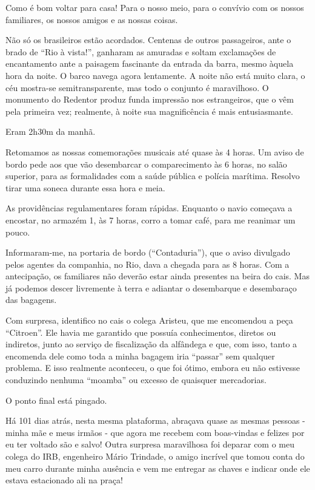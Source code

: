 Como é bom voltar para casa! Para o nosso meio, para o convívio com os nossos familiares, os nossos amigos e as nossas coisas.

Não só os brasileiros estão acordados. Centenas de outros passageiros, ante o brado de “Rio à vista!”, ganharam as amuradas e soltam exclamações de encantamento ante a paisagem fascinante da entrada da barra, mesmo àquela hora da noite. O barco navega agora lentamente. A noite não está muito clara, o céu mostra-se semitransparente, mas todo o conjunto é maravilhoso. O monumento do Redentor produz funda impressão nos estrangeiros, que o vêm pela primeira vez; realmente, à noite sua magnificência é mais entusiasmante.

Eram 2h30m da manhã.

Retomamos as nossas comemorações musicais até quase às 4 horas. Um aviso de bordo pede aos que vão desembarcar o comparecimento às 6 horas, no salão superior, para as formalidades com a saúde pública e polícia marítima. Resolvo tirar uma soneca durante essa hora e meia.

As providências regulamentares foram rápidas. Enquanto o navio começava a encostar, no armazém 1, às 7 horas, corro a tomar café, para me reanimar um pouco.

Informaram-me, na portaria de bordo (“Contaduria”), que o aviso divulgado pelos agentes da companhia, no Rio, dava a chegada para as 8 horas. Com a antecipação, os familiares não deverão estar ainda presentes na beira do cais. Mas já podemos descer livremente à terra e adiantar o desembarque e desembaraço das bagagens.

Com surpresa, identifico no cais o colega Aristeu, que me encomendou a peça “Citroen”. Ele havia me garantido que possuía conhecimentos, diretos ou indiretos, junto ao serviço de fiscalização da alfândega e que, com isso, tanto a encomenda dele como toda a minha bagagem iria “passar” sem qualquer problema. E isso realmente aconteceu, o que foi ótimo, embora eu não estivesse conduzindo nenhuma “moamba” ou excesso de quaisquer mercadorias.

O ponto final está pingado.

Há 101 dias atrás, nesta mesma plataforma, abraçava quase as mesmas pessoas - minha mãe e meus irmãos - que agora me recebem com boas-vindas e felizes por eu ter voltado são e salvo! Outra surpresa maravilhosa foi deparar com o meu colega do IRB, engenheiro Mário Trindade, o amigo incrível que tomou conta do meu carro durante minha ausência e vem me entregar as chaves e indicar onde ele estava estacionado ali na praça!

